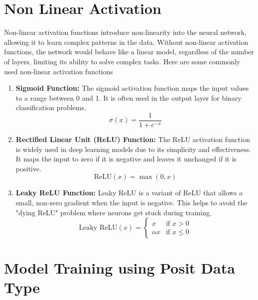 \section{Non Linear Activation}
Non-linear activation functions introduce non-linearity into the neural network, allowing it to learn complex patterns in the data. Without non-linear activation functions, the network would behave like a linear model, regardless of the number of layers, limiting its ability to solve complex tasks. Here are some commonly used non-linear activation functions
\begin{enumerate}
    \item \textbf{Sigmoid Function:} The sigmoid activation function maps the input values to a range between 0 and 1. It is often used in the output layer for binary classification problems.
    \begin{equation}
        \sigma(x) = \frac{1}{1 + e^{-x}}
    \end{equation}
    \item \textbf{Rectified Linear Unit (ReLU) Function:} The ReLU activation function is widely used in deep learning models due to its simplicity and effectiveness. It maps the input to zero if it is negative and leaves it unchanged if it is positive.
    \begin{equation}
\text{ReLU}(x) = \max(0, x)
\end{equation}

    \item \textbf{Leaky ReLU Function:} Leaky ReLU is a variant of ReLU that allows a small, non-zero gradient when the input is negative. This helps to avoid the "dying ReLU" problem where neurons get stuck during training.
    \begin{equation}
\text{Leaky ReLU}(x) = \begin{cases}
x & \text{if } x > 0 \\
\alpha x & \text{if } x \leq 0
\end{cases}
\end{equation}

\end{enumerate}

\section{Model Training using Posit Data Type}
